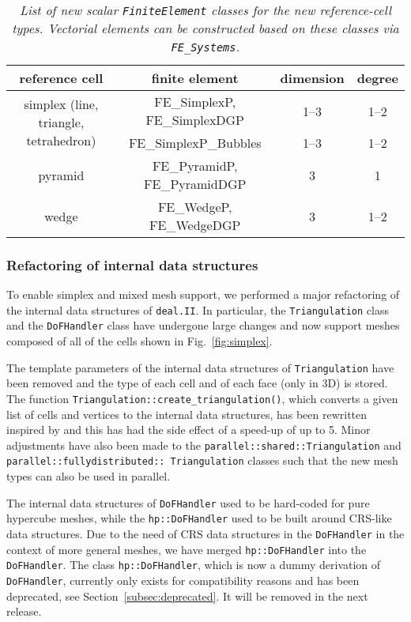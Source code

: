 \documentclass{ansarticle-preprint}
\newcommand{\specialword}[1]{\texttt{#1}}
\newcommand{\dealii}{{\specialword{deal.II}}\xspace}
\begin{document}
\begin{table}
  \caption{\it List of new scalar \texttt{FiniteElement} classes for the new
  reference-cell types. Vectorial elements can be constructed based on these classes
  via \texttt{FE\_Systems}.}\label{tab:simplex:fe}
  \centering
  \begin{tabular}{cccc}
    \toprule
    \textbf{reference cell} & \textbf{finite element} & \textbf{dimension} & \textbf{degree}\\
    \midrule
    \multirow{2}{*}{simplex (line, triangle, tetrahedron)} & FE\_SimplexP, FE\_SimplexDGP  & 1--3 & 1--2 \\
                                          & FE\_SimplexP\_Bubbles  & 1--3 & 1--2 \\
    pyramid & FE\_PyramidP, FE\_PyramidDGP  & 3 & 1 \\
    wedge & FE\_WedgeP, FE\_WedgeDGP  & 3 & 1--2 \\
    \bottomrule
  \end{tabular}
\end{table}


\subsubsection{Refactoring of internal data structures}

To enable simplex and mixed mesh support, we performed a major refactoring of the internal data structures of \dealii. In particular, the \texttt{Triangulation} class and
the \texttt{DoFHandler} class have undergone large changes and now
support meshes composed of all of the cells shown in Fig.~\ref{fig:simplex}.

The template parameters of the internal data structures of \texttt{Triangulation}
have been removed and the type of each cell and of each face (only in 3D) is stored. The function
\texttt{Triangulation::create\_\allowbreak triangulation()}, which converts a given list of
cells and vertices to the internal data structures, has been rewritten
inspired by \citep{logg2012} and this has had the side effect of a speed-up of up to 5. Minor adjustments
have also been made to the \texttt{parallel::shared::Triangulation}
and \texttt{parallel::\allowbreak fullydistributed::\allowbreak
  Triangulation} classes such that
the new mesh types can also be used in parallel.

The internal data structures of \texttt{DoFHandler} used to be hard-coded for pure
hypercube meshes, while the \texttt{hp::DoFHandler} used to be built around
CRS-like data structures. Due to the need of CRS data structures in the
\texttt{DoFHandler} in the context of more general meshes, we have merged
\texttt{hp::DoFHandler} into the \texttt{DoFHandler}. The class \texttt{hp::DoFHandler}, which is now a dummy derivation of \texttt{DoFHandler}, currently only exists for compatibility reasons and has
been deprecated, see Section~\ref{subsec:deprecated}. It will be
removed in the next release.
\end{document}
